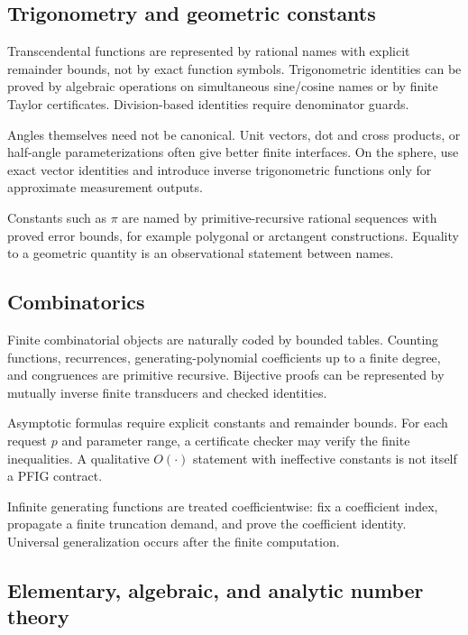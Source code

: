 \subsection{Trigonometry and geometric constants}

Transcendental functions are represented by rational names with explicit remainder bounds, not by exact function symbols.  Trigonometric identities can be proved by algebraic operations on simultaneous sine/cosine names or by finite Taylor certificates.  Division-based identities require denominator guards.

Angles themselves need not be canonical.  Unit vectors, dot and cross products, or half-angle parameterizations often give better finite interfaces.  On the sphere, use exact vector identities and introduce inverse trigonometric functions only for approximate measurement outputs.

Constants such as \(\pi\) are named by primitive-recursive rational sequences with proved error bounds, for example polygonal or arctangent constructions.  Equality to a geometric quantity is an observational statement between names.

\subsection{Combinatorics}

Finite combinatorial objects are naturally coded by bounded tables.  Counting functions, recurrences, generating-polynomial coefficients up to a finite degree, and congruences are primitive recursive.  Bijective proofs can be represented by mutually inverse finite transducers and checked identities.

Asymptotic formulas require explicit constants and remainder bounds.  For each request \(p\) and parameter range, a certificate checker may verify the finite inequalities.  A qualitative \(O(\cdot)\) statement with ineffective constants is not itself a PFIG contract.

Infinite generating functions are treated coefficientwise: fix a coefficient index, propagate a finite truncation demand, and prove the coefficient identity.  Universal generalization occurs after the finite computation.

\subsection{Elementary, algebraic, and analytic number theory}

